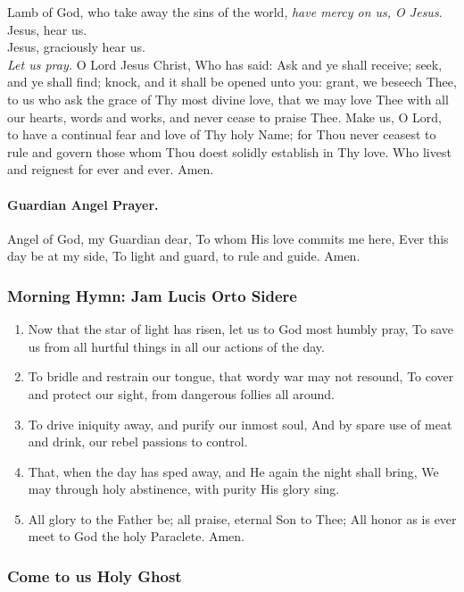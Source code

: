 \documentclass{article}
\begin{document}
\begin{multicols}{3}
Lamb of God, who take away the sins of the world, \textit{have mercy on us, O Jesus.}\\
Jesus, hear us.\\
Jesus, graciously hear us.\\
\textit{Let us pray.} O Lord Jesus Christ, Who has said: Ask and ye shall receive;
seek, and ye shall find; knock, and it shall be opened unto you: grant,
we beseech Thee, to us who ask the grace of Thy most divine love, that we may
love Thee with all our hearts, words and works, and never cease to praise Thee.
Make us, O Lord, to have a continual fear and love of Thy holy Name; for Thou
never ceasest to rule and govern those whom Thou doest solidly establish in Thy
love. Who livest and reignest for ever and ever. Amen.

\paragraph*{Guardian Angel Prayer.}  Angel of God, my Guardian dear, To whom His love commits me here, Ever this day be at my side, To light and guard, to rule and guide.  Amen.

\subsubsection*{Morning Hymn: Jam Lucis Orto Sidere}

\begin{enumerate}
    \item Now that the star of light has risen, let us to God most humbly pray,
To save us from all hurtful things in all our actions of the day.
    \item To bridle and restrain our tongue, that wordy war may not resound,
To cover and protect our sight,  from dangerous follies all around.
    \item To drive iniquity away, and purify our inmost soul,
And by spare use of meat and drink, our rebel passions to control.
    \item That, when the day has sped away, and He again the night shall bring,
We may through holy abstinence, with purity His glory sing.
    \item All glory to the Father be; all praise, eternal Son to Thee;
All honor as is ever meet to God the holy Paraclete. Amen.
\end{enumerate}

\subsubsection*{Come to us Holy Ghost}


\end{multicols}
\end{document}
